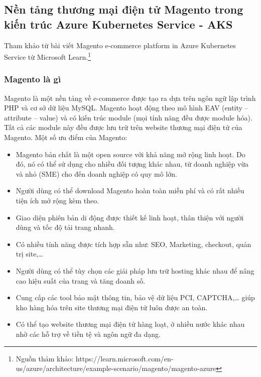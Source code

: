 \subsection{Nền tảng thương mại điện tử Magento trong kiến trúc Azure Kubernetes Service - AKS}
\noindent Tham khảo từ bài viết Magento e-commerce platform in Azure Kubernetes Service từ Microsoft Learn.\footnote{Nguồn thảm khảo: https://learn.microsoft.com/en-us/azure/architecture/example-scenario/magento/magento-azure}
\subsubsection{Magento là gì}
Magento là một nền tảng về e-commerce được tạo ra dựa trên ngôn ngữ lập trình PHP và cơ sở dữ liệu MySQL. Magento hoạt động theo mô hình EAV (entity – attribute – value) và có kiến trúc module (mọi tính năng đều được module hóa). Tất cả các module này đều được lưu trữ trên website thương mại điện tử của Magento.
\newline
Một số ưu điểm của Magento:
    \begin{itemize}
        \item Magento bản chất là một open source với khả năng mở rộng linh hoạt. Do đó, nó có thể sử dụng cho nhiều đối tượng khác nhau, từ doanh nghiệp vừa và nhỏ (SME) cho đến doanh nghiệp có quy mô lớn.
        \item Người dùng có thể download Magento hoàn toàn miễn phí và có rất nhiều tiện ích mở rộng kèm theo.
        \item Giao diện phiên bản di động được thiết kế linh hoạt, thân thiện với người dùng và tốc độ tải trang nhanh.
        \item Có nhiều tính năng được tích hợp sẵn như: SEO, Marketing, checkout, quản trị site,…
        \item Người dùng có thể tùy chọn các giải pháp lưu trữ hosting khác nhau để nâng cao hiệu suất của trang và tăng doanh số.
        \item Cung cấp các tool bảo mật thông tin, bảo vệ dữ liệu PCI, CAPTCHA,… giúp kho hàng hóa trên site thương mại điện tử luôn được an toàn.
        \item Có thể tạo website thương mại điện tử hàng loạt, ở nhiều nước khác nhau nhờ các hỗ trợ về tiền tệ và ngôn ngữ đa dạng.    
    \end{itemize}
